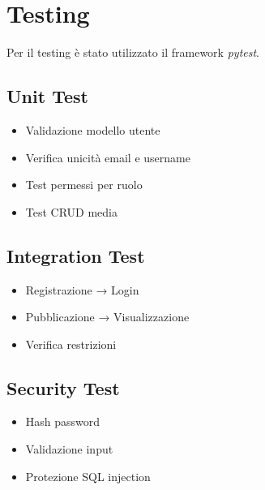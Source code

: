 \documentclass[12pt,a4paper]{article}
\begin{document}
\section{Testing}

Per il testing è stato utilizzato il framework \textit{pytest}.

\subsection{Unit Test}
\begin{itemize}
    \item Validazione modello utente
    \item Verifica unicità email e username
    \item Test permessi per ruolo
    \item Test CRUD media
\end{itemize}

\subsection{Integration Test}
\begin{itemize}
    \item Registrazione → Login
    \item Pubblicazione → Visualizzazione
    \item Verifica restrizioni
\end{itemize}

\subsection{Security Test}
\begin{itemize}
    \item Hash password
    \item Validazione input
    \item Protezione SQL injection
\end{itemize}
\end{document}
